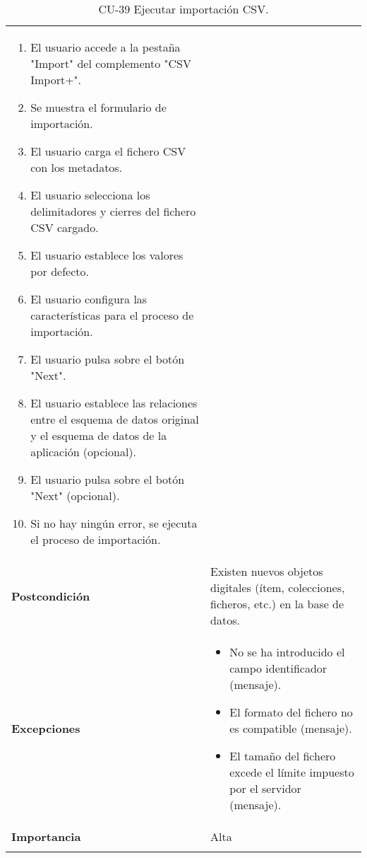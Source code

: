 \begin{longtable}[]{@{}ll@{}}
\begin{minipage}[t]{0.78\columnwidth}
\begin{enumerate}
\def\labelenumi{\arabic{enumi}.}
\tightlist
\item
  El usuario accede a la pestaña "Import" del complemento "CSV Import+".
\item
  Se muestra el formulario de importación.
\item
  El usuario carga el fichero CSV con los metadatos.
\item
  El usuario selecciona los delimitadores y cierres del fichero CSV
  cargado.
\item
  El usuario establece los valores por defecto.
\item
  El usuario configura las características para el proceso de
  importación.
\item
  El usuario pulsa sobre el botón "Next".
\item
  El usuario establece las relaciones entre el esquema de datos original
  y el esquema de datos de la aplicación (opcional).
\item
  El usuario pulsa sobre el botón "Next" (opcional).
\item
  Si no hay ningún error, se ejecuta el proceso de importación.
\end{enumerate}\strut
\end{minipage}\tabularnewline
\begin{minipage}[t]{0.16\columnwidth}\raggedright
\textbf{Postcondición}\strut
\end{minipage} & \begin{minipage}[t]{0.78\columnwidth}\raggedright
Existen nuevos objetos digitales (ítem, colecciones, ficheros, etc.) en
la base de datos.\strut
\end{minipage}\tabularnewline
\begin{minipage}[t]{0.16\columnwidth}\raggedright
\textbf{Excepciones}\strut
\end{minipage} & \begin{minipage}[t]{0.78\columnwidth}\raggedright
\begin{itemize}
\tightlist
\item
  No se ha introducido el campo identificador (mensaje).
\item
  El formato del fichero no es compatible (mensaje).
\item
  El tamaño del fichero excede el límite impuesto por el servidor
  (mensaje).
\end{itemize}\strut
\end{minipage}\tabularnewline
\begin{minipage}[t]{0.16\columnwidth}\raggedright
\textbf{Importancia}\strut
\end{minipage} & \begin{minipage}[t]{0.78\columnwidth}\raggedright
Alta\strut
\end{minipage}\tabularnewline
\bottomrule
\caption{CU-39 Ejecutar importación CSV.}
\end{longtable}

